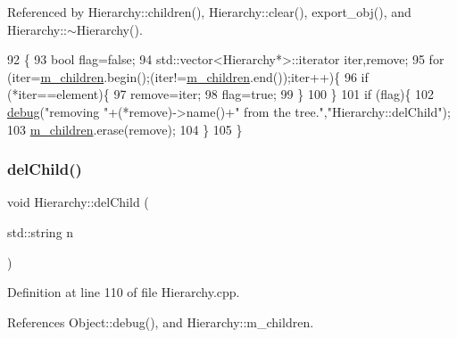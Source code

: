 Referenced by Hierarchy\+::children(), Hierarchy\+::clear(), export\+\_\+obj(), and Hierarchy\+::$\sim$\+Hierarchy().


\begin{DoxyCode}
92                                           \{
93   \textcolor{keywordtype}{bool} flag=\textcolor{keyword}{false};
94   std::vector<Hierarchy*>::iterator iter,\textcolor{keyword}{remove};
95   \textcolor{keywordflow}{for} (iter=\hyperlink{classHierarchy_a038816763941fd4a930504917f60483b}{m\_children}.begin();(iter!=\hyperlink{classHierarchy_a038816763941fd4a930504917f60483b}{m\_children}.end());iter++)\{
96     \textcolor{keywordflow}{if} (*iter==element)\{
97       \textcolor{keyword}{remove}=iter;
98       flag=\textcolor{keyword}{true};
99     \}
100   \}
101   \textcolor{keywordflow}{if} (flag)\{
102     \hyperlink{classObject_aac010553f022165573714b7014a15f0d}{debug}(\textcolor{stringliteral}{"removing "}+(*remove)->name()+\textcolor{stringliteral}{" from the tree."},\textcolor{stringliteral}{"Hierarchy::delChild"});
103     \hyperlink{classHierarchy_a038816763941fd4a930504917f60483b}{m\_children}.erase(\textcolor{keyword}{remove});
104   \}
105 \}
\end{DoxyCode}
\mbox{\label{classHierarchy_a1928ac7615fe0b5e55cd707f70dc6781}} 
\subsubsection{\texorpdfstring{del\+Child()}{delChild()}\hspace{0.1cm}{\footnotesize\ttfamily [2/2]}}
{\footnotesize\ttfamily void Hierarchy\+::del\+Child (\begin{DoxyParamCaption}\item[{std\+::string}]{n }\end{DoxyParamCaption})\hspace{0.3cm}{\ttfamily [inherited]}}



Definition at line 110 of file Hierarchy.\+cpp.



References Object\+::debug(), and Hierarchy\+::m\+\_\+children.


